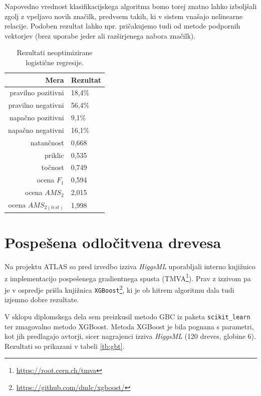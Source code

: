 \documentclass[11pt,a4paper,openany]{book}
\begin{document}
Napovedno vrednost klasifikacijskega algoritma bomo torej znatno lahko izboljšali zgolj z vpeljavo novih značilk, predvsem takih, ki v sistem vnašajo nelinearne relacije. Podoben rezultat lahko npr. pričakujemo tudi od metode podpornih vektorjev (brez uporabe jeder ali razširjenega nabora značilk).

\begin{table}[h!]
	\centering
	\begin{tabular}{rl}
		\hline
		\textbf{Mera} & \textbf{Rezultat} \\
		\hline
		pravilno pozitivni & 18,4\%\\
		pravilno negativni & 56,4\% \\
		napačno pozitivni & 9,1\% \\
		napačno negativni & 16,1\% \\
		natančnost & 0,668 \\
		priklic & 0,535 \\
		točnost & 0,749 \\
		ocena $F_1$ & 0,594 \\
		ocena $AMS_2$ & 2,015 \\
		ocena $AMS_{2(test)}$ & 1,998 		
	\end{tabular}
	\caption{Rezultati neoptimizirane logistične regresije.}
	\label{tb:logisticna}
\end{table}


\section{Pospešena odločitvena drevesa}

Na projektu ATLAS so pred izvedbo izziva \textit{HiggsML} uporabljali interno knjižnico z implementacijo pospešenega gradientnega spusta (TMVA\footnote{\url{https://root.cern.ch/tmva}}). Prav z izzivom pa je v ospredje prišla knjižnica \texttt{XGBoost}\footnote{\url{https://github.com/dmlc/xgboost/}}, ki je ob hitrem algoritmu dala tudi izjemno dobre rezultate.

V sklopu diplomskega dela sem preizkusil metodo GBC iz paketa \texttt{scikit\_learn} ter zmagovalno metodo XGBoost. Metoda XGBoost je bila pognana s parametri, kot jih predlagajo avtorji, sicer nagrajenci izziva \textit{HiggsML} (120 dreves, globine 6). Rezultati so prikazani v tabeli \ref{tb:gbt}.
\end{document}
